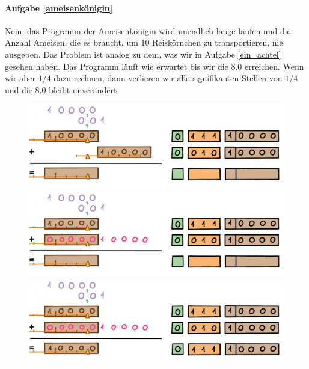 
\paragraph{Aufgabe \ref{ameisenkönigin}}

Nein, das Programm der Ameisenkönigin wird unendlich lange laufen und die Anzahl Ameisen, die es braucht, um 10 Reiskörnchen zu transportieren, nie ausgeben. Das Problem ist analog zu dem, was wir in Aufgabe \ref{ein_achtel} gesehen haben. Das Programm läuft wie erwartet bis wir die \(8.0\) erreichen. Wenn wir aber \(1/4\) dazu rechnen, dann verlieren wir alle signifikanten Stellen von \(1/4\) und die \(8.0\) bleibt unverändert.
\begin{figure}[H]
\centering
\includegraphics[width=\linewidth]{Pictures/Addition8and1-4_1.png} 
\includegraphics[width=\linewidth]{Pictures/Addition8and1-4_2.png} 
\includegraphics[width=\linewidth]{Pictures/Addition8and1-4_3.png} 
\end{figure}